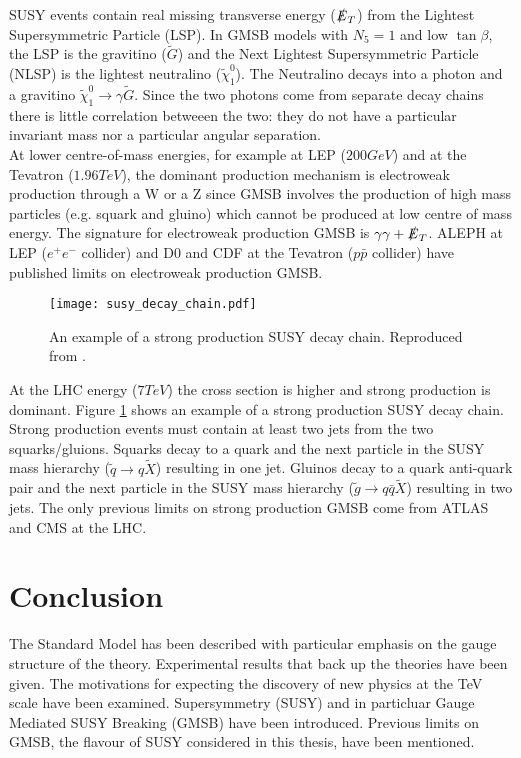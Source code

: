 SUSY events contain real missing transverse energy ($\slashed{E}_{T}$) from the Lightest 
Supersymmetric Particle (LSP). In GMSB models with $N_{5} = 1$ and low
$\tan\beta$, the LSP is the gravitino ($\tilde{G}$) and the Next Lightest 
Supersymmetric Particle (NLSP) is the lightest neutralino 
($\tilde{\chi}_{1}^{0}$). The Neutralino decays into a photon and a gravitino 
$\tilde{\chi}_{1}^{0}\rightarrow\gamma\tilde{G}$. Since the two photons come 
from separate decay chains there is little correlation betweeen the two: they do 
not have a particular invariant mass nor a particular angular separation. \\

At lower centre-of-mass energies, for example at LEP ($200\unit{GeV}$) and at 
the Tevatron ($1.96\unit{TeV}$), the dominant production mechanism is electroweak 
production through a W or a Z since GMSB involves the production of high mass
particles (e.g. squark and gluino) which cannot be produced at low centre of
mass energy. The signature for electroweak production GMSB is $\gamma\gamma + 
\slashed{E}_{T}$. ALEPH \cite{aleph} at LEP ($e^{+}e^{-}$ collider) and D0 \cite{d0} and 
CDF \cite{cdf} at the Tevatron ($p\bar{p}$ collider) have published limits on 
electroweak production GMSB. \\

\begin{figure}
\begin{center}
\texttt{[image: susy\_decay\_chain.pdf]}
\end{center}
\caption{An example of a strong production SUSY decay chain. Reproduced from
\cite{gmsb_at_lhc}.}
\label{fig:susydecay}
\end{figure}

At the LHC energy ($7\unit{TeV}$) the cross section is higher and strong 
production is dominant. Figure \ref{fig:susydecay} shows an example of a strong 
production SUSY decay chain. Strong production events must contain at least two 
jets from the two squarks/gluions. Squarks decay to a quark and the next 
particle in the SUSY mass hierarchy ($\tilde{q}\rightarrow q\tilde{X}$) 
resulting in one jet. Gluinos decay to a quark anti-quark pair and the next 
particle in the SUSY mass hierarchy ($\tilde{g}\rightarrow q\bar{q}\tilde{X}$) 
resulting in two jets. The only previous limits on strong production GMSB come 
from ATLAS \cite{atlas} and CMS \cite{ra3} at the LHC. \\

\section{Conclusion}

The Standard Model has been described with particular emphasis on the gauge
structure of the theory. Experimental results that back up the theories have
been given. The motivations for expecting the discovery of new physics at the
TeV scale have been examined. Supersymmetry (SUSY) and in particluar Gauge
Mediated SUSY Breaking (GMSB) have been introduced. Previous limits on GMSB, the
flavour of SUSY considered in this thesis, have been mentioned.
